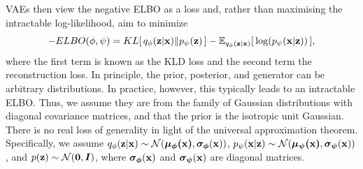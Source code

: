 \documentclass[onefignum,onetabnum]{siamonline190516}
\begin{document}
VAEs then view the negative ELBO as a loss and, rather than maximising the intractable log-likelihood, aim to minimize
\begin{equation}
\label{eqn:elbo}
    -ELBO(\phi, \psi) = KL[\,q_{\phi}({\mathbf{z}}|{\mathbf{x}}) \lVert p_{\psi}({\mathbf{z}})\,] - {\mathbb{E}}_{q_{\phi}({\mathbf{z}}|{\mathbf{x}})}[\,\log (p_{\psi}({\mathbf{x}}|{\mathbf{z}}))\,],
\end{equation}
where the first term is known as the KLD loss and the second term the reconstruction loss. In principle, the prior,  posterior, and generator can be arbitrary distributions. In practice, however, this typically leads to an intractable ELBO. Thus, we assume they are from the family of Gaussian distributions with diagonal covariance matrices, and that the prior is  the isotropic unit Gaussian. There is no real loss of generality in light of the universal approximation theorem. Specifically, we assume $q_{\phi}({\mathbf{z}}|{\mathbf{x}}) \sim \mathcal{N}(\boldsymbol{\mu_{\phi}({\mathbf{x}})}, \boldsymbol{\sigma_{\phi}}({\mathbf{x}}))$, $p_\psi({\mathbf{x}}|{\mathbf{z}})\sim\mathcal{N}(\boldsymbol{\mu_{\psi}({\mathbf{x}})}, \boldsymbol{\sigma_{\psi}}({\mathbf{x}}))$, and $p({\mathbf{z}}) \sim \mathcal{N}(\boldsymbol{0}, \boldsymbol{I})$, where $\boldsymbol{\sigma_{\phi}}({\mathbf{x}})$ and $\boldsymbol{\sigma_{\psi}}({\mathbf{x}})$ are diagonal matrices.
\end{document}
